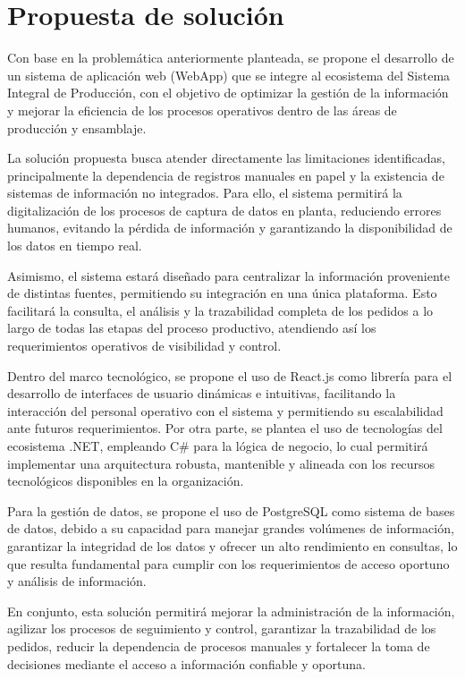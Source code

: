 \section{Propuesta de solución}

Con base en la problemática anteriormente planteada, se propone el desarrollo de un sistema de aplicación web (WebApp) que se integre al ecosistema del Sistema Integral de Producción, con el objetivo de optimizar la gestión de la información y mejorar la eficiencia de los procesos operativos dentro de las áreas de producción y ensamblaje.

La solución propuesta busca atender directamente las limitaciones identificadas, principalmente la dependencia de registros manuales en papel y la existencia de sistemas de información no integrados. Para ello, el sistema permitirá la digitalización de los procesos de captura de datos en planta, reduciendo errores humanos, evitando la pérdida de información y garantizando la disponibilidad de los datos en tiempo real.

Asimismo, el sistema estará diseñado para centralizar la información proveniente de distintas fuentes, permitiendo su integración en una única plataforma. Esto facilitará la consulta, el análisis y la trazabilidad completa de los pedidos a lo largo de todas las etapas del proceso productivo, atendiendo así los requerimientos operativos de visibilidad y control.

Dentro del marco tecnológico, se propone el uso de React.js como librería para el desarrollo de interfaces de usuario dinámicas e intuitivas, facilitando la interacción del personal operativo con el sistema y permitiendo su escalabilidad ante futuros requerimientos. Por otra parte, se plantea el uso de tecnologías del ecosistema .NET, empleando C\# para la lógica de negocio, lo cual permitirá implementar una arquitectura robusta, mantenible y alineada con los recursos tecnológicos disponibles en la organización.

Para la gestión de datos, se propone el uso de PostgreSQL como sistema de bases de datos, debido a su capacidad para manejar grandes volúmenes de información, garantizar la integridad de los datos y ofrecer un alto rendimiento en consultas, lo que resulta fundamental para cumplir con los requerimientos de acceso oportuno y análisis de información.

En conjunto, esta solución permitirá mejorar la administración de la información, agilizar los procesos de seguimiento y control, garantizar la trazabilidad de los pedidos, reducir la dependencia de procesos manuales y fortalecer la toma de decisiones mediante el acceso a información confiable y oportuna.